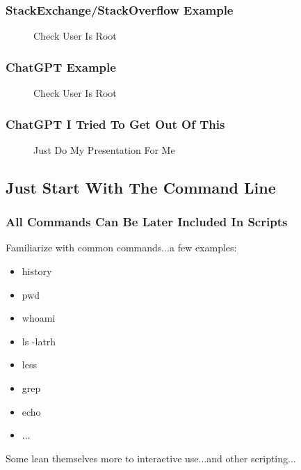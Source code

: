 \documentclass{beamer}
\begin{document}
\begin{frame}\frametitle{StackExchange/StackOverflow Example}
  \begin{figure}[!htb]
    \linewidth
    \begin{center}
    \end{center}
    \caption{Check User Is Root}\label{fig:stack-user-is-root}
  \end{figure}
\end{frame}

\begin{frame}\frametitle{ChatGPT Example}
  \begin{figure}[!htb]
    \linewidth
    \begin{center}
    \end{center}
    \caption{Check User Is Root}\label{fig:chat-user-is-root}
  \end{figure}
\end{frame}

\begin{frame}\frametitle{ChatGPT I Tried To Get Out Of This}
  \begin{figure}[!htb]
    \linewidth
    \begin{center}
    \end{center}
    \caption{Just Do My Presentation For Me}\label{fig:chat-all}
  \end{figure}
\end{frame}

\subsection{Just Start With The Command Line}
\begin{frame}\frametitle{All Commands Can Be Later Included In Scripts}
  Familiarize with common commands...a few examples:
  \begin{itemize}
  \item history
  \item pwd
  \item whoami
  \item ls -latrh
  \item less
  \item grep
  \item echo
  \item ...
  \end{itemize}

  Some lean themselves more to interactive use...and other scripting...
\end{frame}
\end{document}
